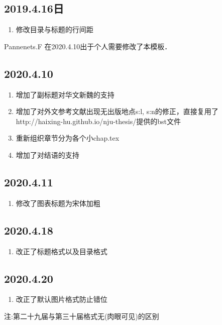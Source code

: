 \subsection{2019.4.16日}
\begin{enumerate}
    \item 修改目录与标题的行间距

\end{enumerate}

Pannenets.F 在2020.4.10出于个人需要修改了本模板．

\subsection{2020.4.10}
\begin{enumerate}
    \item 增加了副标题对华文新魏的支持
    \item 增加了对外文参考文献\cite{ghostnet}出现无出版地点s:l, s:n的修正，直接复用了http://haixing-hu.github.io/nju-thesis/提供的bst文件
    \item 重新组织章节分为各个小chap.tex
    \item 增加了对结语的支持
\end{enumerate}


\subsection{2020.4.11}
\begin{enumerate}
    \item 修改了图表标题为宋体加粗
\end{enumerate}

\subsection{2020.4.18}
\begin{enumerate}
    \item 改正了标题格式以及目录格式
\end{enumerate}

\subsection{2020.4.20}
\begin{enumerate}
    \item 改正了默认图片格式防止错位
\end{enumerate}

注:第二十九届与第三十届格式无(肉眼可见)的区别

